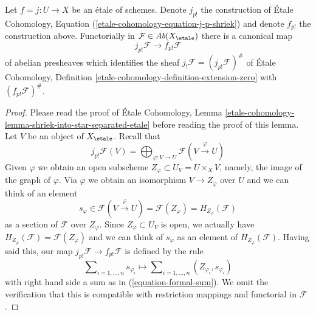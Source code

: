 \begin{lemma}
\label{lemma-finite-support-etale-shriek}
Let $f = j : U \to X$ be an \'etale of schemes. Denote $j_{p!}$
the construction of \'Etale Cohomology, Equation
(\ref{etale-cohomology-equation-j-p-shriek})
and denote $f_{p!}$ the construction above. Functorially in
$\mathcal{F} \in \textit{Ab}(X_\etale)$ there is a canonical map
$$
j_{p!}\mathcal{F} \longrightarrow f_{p!}\mathcal{F}
$$
of abelian presheaves which identifies the sheaf
$j_!\mathcal{F} = (j_{p!}\mathcal{F})^\#$ of \'Etale Cohomology,
Definition \ref{etale-cohomology-definition-extension-zero}
with $(f_{p!}\mathcal{F})^\#$.
\end{lemma}

\begin{proof}
Please read the proof of \'Etale Cohomology, Lemma
\ref{etale-cohomology-lemma-shriek-into-star-separated-etale}
before reading the proof of this lemma.
Let $V$ be an object of $X_\etale$. Recall that
$$
j_{p!}\mathcal{F}(V) =
\bigoplus\nolimits_{\varphi : V \to U} \mathcal{F}(V \xrightarrow{\varphi} U)
$$
Given $\varphi$ we obtain an open subscheme
$Z_\varphi \subset U_V = U \times_X V$, namely,
the image of the graph of $\varphi$. Via $\varphi$
we obtain an isomorphism $V \to Z_\varphi$ over $U$
and we can think of an element
$$
s_\varphi \in \mathcal{F}(V \xrightarrow{\varphi} U) =
\mathcal{F}(Z_\varphi) = H_{Z_\varphi}(\mathcal{F})
$$
as a section of $\mathcal{F}$ over $Z_{\varphi}$. Since
$Z_\varphi \subset U_V$ is open, we actually have
$H_{Z_\varphi}(\mathcal{F}) = \mathcal{F}(Z_\varphi)$
and we can think of $s_\varphi$ as an element of $H_{Z_\varphi}(\mathcal{F})$.
Having said this, our map $j_{p!}\mathcal{F} \to f_{p!}\mathcal{F}$
is defined by the rule
$$
\sum\nolimits_{i = 1, \ldots, n} s_{\varphi_i}
\longmapsto
\sum\nolimits_{i = 1, \ldots, n} (Z_{\varphi_i}, s_{\varphi_i})
$$
with right hand side a sum as in (\ref{equation-formal-sum}).
We omit the verification that this is compatible with restriction
mappings and functorial in $\mathcal{F}$.


\end{proof}
